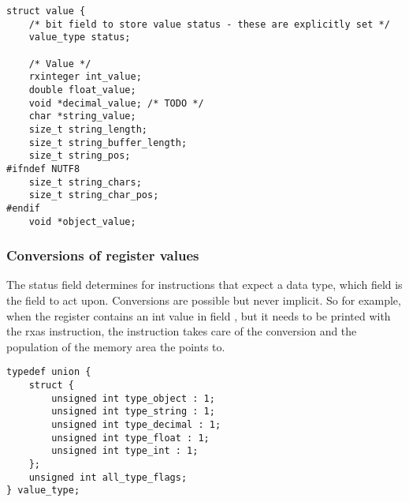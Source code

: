 \begin{lstlisting}[label=crexxregister,caption={The
\crexx{} Register implementation in C}]
struct value {
    /* bit field to store value status - these are explicitly set */
    value_type status;

    /* Value */
    rxinteger int_value;
    double float_value;
    void *decimal_value; /* TODO */
    char *string_value;
    size_t string_length;
    size_t string_buffer_length;
    size_t string_pos;
#ifndef NUTF8
    size_t string_chars;
    size_t string_char_pos;
#endif
    void *object_value;
\end{lstlisting}

\subsubsection{Conversions of register values}
The status field determines for instructions that expect a data type,
which field is the field to act upon. Conversions are possible but
never implicit. So for example, when the register contains an int
value in field , but it needs to be printed with the rxas
 instruction, the
 instruction takes care of the conversion and the population of the
memory area the  points to. 

\begin{lstlisting}[label=crexxregister,caption={Values of
the Status field}]
typedef union {
    struct {
        unsigned int type_object : 1;
        unsigned int type_string : 1;
        unsigned int type_decimal : 1;
        unsigned int type_float : 1;
        unsigned int type_int : 1;
    };
    unsigned int all_type_flags;
} value_type;
\end{lstlisting}

